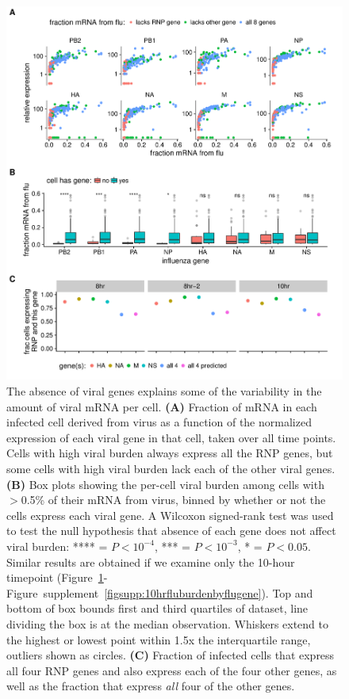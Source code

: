 \documentclass[9pt,lineno]{elife}
\begin{document}
\begin{figure}[t!]
\centerline{\includegraphics[width=0.9\linewidth]{figures/p_flu_burden_flu_gene_merge.pdf}}
\caption{\label{fig:fluburdenbyflugene}
The absence of viral genes explains some of the variability in the amount of viral mRNA per cell.
{\bf (A)} 
Fraction of mRNA in each infected cell derived from virus as a function of the normalized expression of each viral gene in that cell, taken over all time points.
Cells with high viral burden always express all the RNP genes, but some cells with high viral burden lack each of the other viral genes.
{\bf (B)}
Box plots showing the per-cell viral burden among cells with $>$0.5\% of their mRNA from virus, binned by whether or not the cells express each viral gene.
A Wilcoxon signed-rank test was used to test the null hypothesis that absence of each gene does not affect viral burden: **** = $P < 10^{-4}$, *** = $P < 10^{-3}$,  * = $P < 0.05$.
Similar results are obtained if we examine only the 10-hour timepoint (Figure~\ref{fig:fluburdenbyflugene}-Figure~supplement~\ref{figsupp:10hrfluburdenbyflugene}).
Top and bottom of box bounds first and third quartiles of dataset, line dividing the box is at the median observation.
Whiskers extend to the highest or lowest point within 1.5x the interquartile range, outliers shown as circles.
{\bf (C)}
Fraction of infected cells that express all four RNP genes and also express each of the four other genes, as well as the fraction that express \emph{all} four of the other genes.
}
\end{figure}
\end{document}
